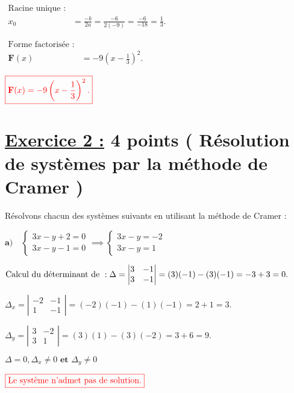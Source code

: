 \documentclass[12pt,a4paper]{article}
\begin{document}
\begin{enumerate}
\(
\begin{aligned}
\text{Racine unique :} \\
x_0 &= \frac{-b}{2a} = \frac{-6}{2(-9)} = \frac{-6}{-18} = \frac{1}{3}.
\end{aligned}
\)

\(
\begin{aligned}
\text{Forme factorisée :} \\
\textbf{F}(x) &= -9(x - \frac{1}{3})^2.
\end{aligned}
\)

\(
\textcolor{red}{\boxed{\textbf{F}(x) = -9\left(x - \frac{1}{3}\right)^2.}}
\)

\end{enumerate}


\section*{\underline{Exercice 2 :} 4 points ( Résolution de systèmes par la méthode de Cramer )}
Résolvons chacun des systèmes suivants en utilisant la méthode de Cramer :

\(\textbf{a)}\quad
\begin{cases}
3x - y + 2 = 0 \\
3x - y - 1 = 0
\end{cases}\implies
\begin{cases}
3x - y = -2 \\
3x - y = 1
\end{cases}
\)


\(
\text{Calcul du déterminant de } : \\
\Delta = \left| \begin{matrix} 3 & -1 \\ 3 & -1 \end{matrix} \right| = (3)(-1) - (3)(-1) = -3 + 3 = 0.
\)

\(
\Delta_{x} = \left| \begin{matrix} -2 & -1 \\ 1 & -1 \end{matrix} \right| = (-2)(-1) - (1)(-1) = 2 + 1 = 3.
\)

\(
\Delta_{y} = \left| \begin{matrix} 3 & -2 \\ 3 & 1 \end{matrix} \right| = (3)(1) - (3)(-2) = 3 + 6 = 9.
\)

\(
\Delta=0, \Delta_{x}\neq 0 \textbf{ et } \Delta_{y}\neq 0
\)

\(
\textcolor{red}{\boxed{\text{Le système n'admet pas de solution.}}}\\
\)
\end{document}
